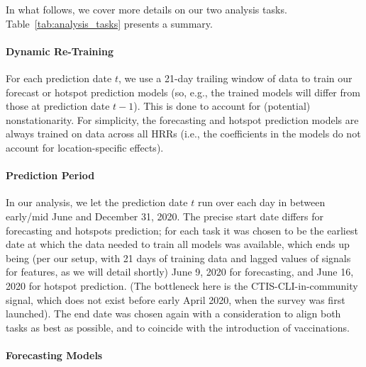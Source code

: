 \documentclass[9pt,twocolumn,twoside,lineno]{pnas-new}
\begin{document}
In what follows, we cover more details on our two analysis
tasks. Table~\ref{tab:analysis_tasks} presents a summary.   

\paragraph{Dynamic Re-Training}

For each prediction date $t$, we use a 21-day trailing window of data to train
our forecast or hotspot prediction models (so, e.g., the trained models will
differ from those at prediction date $t-1$).  This is done to account for
(potential) nonstationarity.  For simplicity, the forecasting and hotspot
prediction models are always trained on data across all HRRs (i.e., the
coefficients in the models do not account for location-specific effects).   

\paragraph{Prediction Period}

In our analysis, we let the prediction date $t$ run over each day in between
early/mid June and December 31, 2020.  The precise start date differs for 
forecasting and hotspots prediction; for each task it was chosen to be the
earliest date at which the data needed to train all models was available, which
ends up being (per our setup, with 21 days of training data and lagged values 
of signals for features, as we will detail shortly) June 9, 2020 for
forecasting, and June 16, 2020 for hotspot prediction. (The bottleneck here is
the CTIS-CLI-in-community signal, which does not exist before early April 2020,
when the survey was first launched). The end date was chosen again with a 
consideration to align both tasks as best as possible,
and to coincide with the
introduction of vaccinations.

\paragraph{Forecasting Models}
\end{document}
